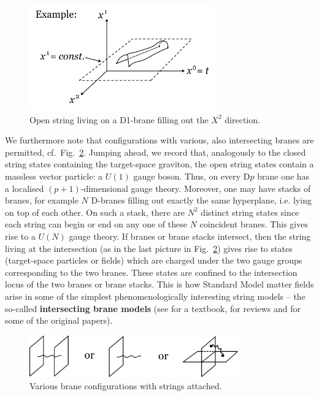 \documentclass[12pt]{article}
\numberwithin{equation}{section}
\begin{document}
\begin{figure}[ht]
\begin{center} 
\includegraphics[width=8cm]{exo.png}
\caption{Open string living on a D1-brane filling out the $X^2$ direction.}
\label{exo} 
\end{center}
\end{figure}

We furthermore note that configurations with various, also intersecting branes are permitted, cf.~Fig.~\ref{brc}. Jumping ahead, we record that, analogously to the closed string states containing the target-space graviton, the open string states contain a massless vector particle: a $U(1)$ gauge boson. Thus, on every D$p$ brane one has a localised $(p+1)$-dimensional gauge theory. Moreover, one may have stacks of branes, for example $N$ D-branes filling out exactly the same hyperplane, i.e. lying on top of each other. On such a stack, there are $N^2$ distinct string states since each string can begin or end on any one of these $N$ coincident branes. This gives rise to a $U(N)$ gauge theory. If branes or brane stacks intersect, then the string living at the intersection (as in the last picture in Fig.~\ref{brc}) gives rise to states (target-space particles or fields) which are charged under the two gauge groups corresponding to the two branes. These states are confined to the intersection locus of the two branes or brane stacks. This is how Standard Model matter fields arise in some of the simplest phenomenologically interesting string models -- the so-called {\bf intersecting brane models} (see \cite{Ibanez:2012zz} for a textbook, \cite{Blumenhagen:2005mu, Blumenhagen:2006ci} for reviews and \cite{Ibanez:2001nd, Blumenhagen:2001te, Cvetic:2001nr} for some of the original papers).

\begin{figure}[ht]
\begin{center} 
\includegraphics[width=9cm]{brc.png}
\caption{Various brane configurations with strings attached.}
\label{brc} 
\end{center}
\end{figure}
\end{document}

